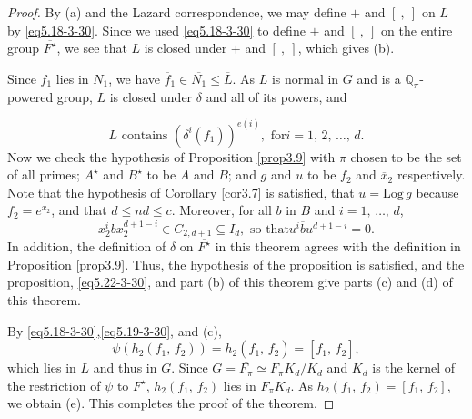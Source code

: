 \documentclass[mathscr]{amsart}
\theoremstyle{theorem}
\theoremstyle{definition}
\numberwithin{equation}{section}
\def \({\left(}
\def \){\right)}
\def \Log{\text{Log}\,}
\begin{document}
\begin{proof}
By (a) and the Lazard correspondence, we may define $+$ and $[~,~]$
on $L$ by \eqref{eq5.18-3-30}.  Since we used \eqref{eq5.18-3-30} to
define $+$ and $[~,~]$ on the entire group $\overline{F^\star}$, we
see that $L$ is closed under $+$ and $[~,~]$, which gives (b).

Since $f_1$ lies in $N_1$, we have $\overline f_1\in
\overline{N_1}\leq \overline L$.  As $L$ is normal in $G$ and is a
$\mathbb{Q}_\pi$-powered group, $L$ is closed under $\delta$ and all
of its powers, and

\begin{equation}\label{eq5.22-3-30}
L\text{ contains }\(\delta^i\(\overline{f_1}\)\)^{e(i)},\text{ for
}i=1,\,2,\,\dots,\,d.
\end{equation}
Now we check the hypothesis of Proposition \ref{prop3.9} with $\pi$
chosen to be the set of all primes; $A^\star$ and $B^\star$ to be
$\overline A$ and $\overline B$; and $g$ and $u$ to be $\overline
f_2$ and $\overline x_2$ respectively.  Note that the hypothesis of
Corollary \ref{cor3.7} is satisfied, that $u=\Log g$ because
$f_2=e^{x_2}$, and that $d\leq nd\leq c$.  Moreover, for all $b$ in
$B$ and $i=1,\,\dots,\,d$,
$$
x_2^ibx_2^{d+1-i}\in C_{2,d+1}\subseteq I_d,\text{ so that
}u^i\overline b u ^{d+1-i}=0.
$$
In addition, the definition of $\delta$ on $\overline{F^\star}$ in
this theorem agrees with the definition in Proposition
\ref{prop3.9}.  Thus, the hypothesis of the proposition is
satisfied, and the proposition, \eqref{eq5.22-3-30}, and part (b) of
this theorem give parts (c) and (d) of this theorem.

By \eqref{eq5.18-3-30},\eqref{eq5.19-3-30}, and (c),
$$
\psi\(h_2\(f_1,\,f_2\)\)=h_2\(\overline{f_1},\,\overline{f_2}\)=\left[\overline{f_1},\,\overline{f_2}\right],
$$
which lies in $L$ and thus in $G$.  Since $G=\overline{F_\pi}\simeq
F_\pi K_d/K_d$ and $K_d$ is the kernel of the restriction of $\psi$
to $F^\star$, $h_2\(f_1,\,f_2\)$ lies in $F_\pi K_d$.  As
$h_2\(f_1,\,f_2\)=\left[f_1,\,f_2\right]$, we obtain (e).  This
completes the proof of the theorem.
\end{proof}
\end{document}
